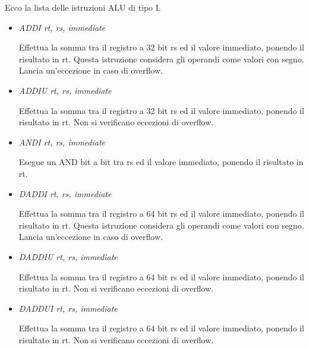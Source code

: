 \documentclass[letterpaper,10pt,english]{sphinxmanual}
\begin{document}
Ecco la lista delle istruzioni ALU di tipo I.
\begin{itemize}
\item {} 
\emph{ADDI rt, rs, immediate}

Effettua la somma tra il registro a 32 bit rs ed il valore immediato,
ponendo il risultato in rt.  Questa istruzione considera gli operandi come
valori con segno.  Lancia un'eccezione in caso di overflow.

\item {} 
\emph{ADDIU rt, rs, immediate}

Effettua la somma tra il registro a 32 bit rs ed il valore immediato,
ponendo il risultato in rt.  Non si verificano eccezioni di overflow.

\end{itemize}
\begin{itemize}
\item {} 
\emph{ANDI rt, rs, immediate}

Esegue un AND bit a bit tra rs ed il valore immediato, ponendo il risultato
in rt.

\item {} 
\emph{DADDI rt, rs, immediate}

Effettua la somma tra il registro a 64 bit rs ed il valore immediato,
ponendo il risultato in rt.  Questa istruzione considera gli operandi come
valori con segno.  Lancia un'eccezione in caso di overflow.

\item {} 
\emph{DADDIU rt, rs, immediate}

Effettua la somma tra il registro a 64 bit rs ed il valore immediato,
ponendo il risultato in rt.  Non si verificano eccezioni di overflow.

\end{itemize}
\begin{itemize}
\item {} 
\emph{DADDUI rt, rs, immediate}

Effettua la somma tra il registro a 64 bit rs ed il valore immediato,
ponendo il risultato in rt.  Non si verificano eccezioni di overflow.

\end{itemize}
\end{document}
